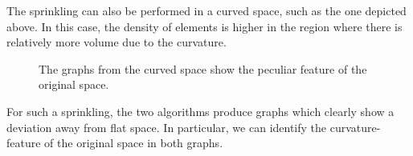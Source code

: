 \documentclass[a4paper,12pt]{article}
\numberwithin{equation}{section}
\begin{document}
The sprinkling can also be performed in a curved space, such as the one depicted above. In this case, the density of elements is higher in the region where there is relatively more volume due to the curvature.

\begin{figure}[h]
\begin{center}
\hfill
{}
\captionsetup{width=400pt}
\caption{The graphs from the curved space show the peculiar feature of the original space.}
\label{fig:Graph6 and Graph7}
\end{center}
\end{figure}

For such a sprinkling, the two algorithms produce graphs which clearly show a deviation away from flat space. In particular, we can identify the curvature-feature of the original space in both graphs.
\end{document}
